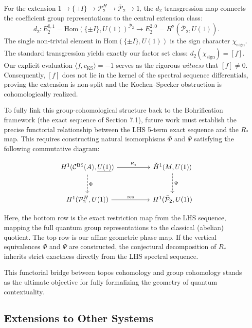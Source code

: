 \documentclass[11pt]{article}
\begin{document}
For the extension $1 \to \{\pm I\} \to \mathcal{P}_2^H \to \bar{\mathcal{P}}_2 \to 1$, the $d_2$ transgression map connects the coefficient group representations to the central extension class:
\[
  d_2: E_2^{0,1} = \mathrm{Hom}(\{\pm I\}, U(1))^{\bar{\mathcal{P}}_2} \longrightarrow E_2^{2,0} = H^2(\bar{\mathcal{P}}_2, U(1)).
\]
The single non-trivial element in $\mathrm{Hom}(\{\pm I\}, U(1))$ is the sign character $\chi_{\mathrm{sign}}$. The standard transgression yields exactly our factor set class: $d_2(\chi_{\mathrm{sign}}) = [f]$.
Our explicit evaluation $\langle f, c_{\mathrm{KS}} \rangle = -1$ serves as the rigorous \emph{witness} that $[f] \neq 0$. Consequently, $[f]$ does not lie in the kernel of the spectral sequence differentials, proving the extension is non-split and the Kochen--Specker obstruction is cohomologically realized.

To fully link this group-cohomological structure back to the Bohrification framework (the exact sequence of Section 7.1), future work must establish the precise functorial relationship between the LHS 5-term exact sequence and the $R_*$ map. This requires constructing natural isomorphisms $\Phi$ and $\Psi$ satisfying the following commutative diagram:

\[
\begin{tikzcd}[row sep=large, column sep=huge]
  H^1(\mathcal{C}^{\mathrm{BS}}(A), \underline{U(1)}) \arrow[r, "R_*"] \arrow[d, dashed, "\Phi"] & \check{H}^1(M, U(1)) \arrow[d, dashed, "\Psi"] \\
  H^1(\mathcal{P}_2^H, U(1)) \arrow[r, "\mathrm{res}"] & H^1(\bar{\mathcal{P}}_2, U(1))
\end{tikzcd}
\]

Here, the bottom row is the exact restriction map from the LHS sequence, mapping the full quantum group representations to the classical (abelian) quotient. The top row is our affine geometric phase map. If the vertical equivalences $\Phi$ and $\Psi$ are constructed, the conjectural decomposition of $R_*$ inherits strict exactness directly from the LHS spectral sequence.

This functorial bridge between topos cohomology and group cohomology stands as the ultimate objective for fully formalizing the geometry of quantum contextuality.

\subsection{Extensions to Other Systems}
\label{subsec:extensions}
\end{document}
